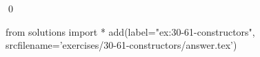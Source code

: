 
\begin{ex}
  \label{ex:30-61-constructors}
  
  \qed
\end{ex}
\begin{python0}
from solutions import *
add(label="ex:30-61-constructors",
    srcfilename='exercises/30-61-constructors/answer.tex')
\end{python0}
